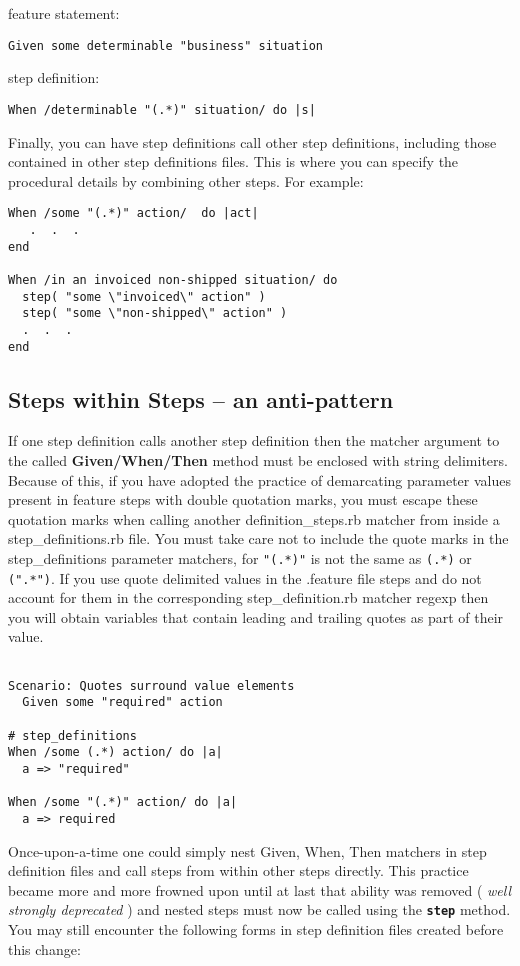 feature statement:
\begin{verbatim}
Given some determinable "business" situation

\end{verbatim}

step definition:
\begin{verbatim}
When /determinable "(.*)" situation/ do |s|

\end{verbatim}

Finally, you can have step definitions call other step definitions, including those contained in other step definitions files.  This is where you can specify the procedural details by combining other steps. For example:

\begin{verbatim}
When /some "(.*)" action/  do |act|
   .  .  .
end

When /in an invoiced non-shipped situation/ do
  step( "some \"invoiced\" action" )
  step( "some \"non-shipped\" action" )
  .  .  .
end

\end{verbatim}
\subsection{Steps within Steps -- an anti-pattern}

If one step definition calls another step definition then the matcher argument to the called \textbf{Given/When/Then} method must be enclosed with string delimiters.  Because of this, if you have adopted the practice of demarcating parameter values present in feature steps with double quotation marks, you must escape these quotation marks when calling another definition\_steps.rb matcher from inside a step\_definitions.rb file.  You must take care not to include the quote marks in the step\_definitions parameter matchers, for \verb+"(.*)"+ is not the same as \verb+(.*)+ or \verb+(".*")+.  If you use quote delimited values in the .feature file steps and do not account for them in the corresponding step\_definition.rb matcher regexp then you will obtain variables that contain leading and trailing quotes as part of their value.

\begin{verbatim}

Scenario: Quotes surround value elements
  Given some "required" action

# step_definitions
When /some (.*) action/ do |a|
  a => "required"

When /some "(.*)" action/ do |a|
  a => required

\end{verbatim}
Once-upon-a-time one could simply nest Given, When, Then matchers in step definition files and call steps from within other steps directly.  This practice became more and more frowned upon until at last that ability was removed ( \emph{well strongly deprecated} ) and nested steps must now be called using the \textbf{\verb+step+} method.  You may still encounter the following forms in step definition files created before this change:

